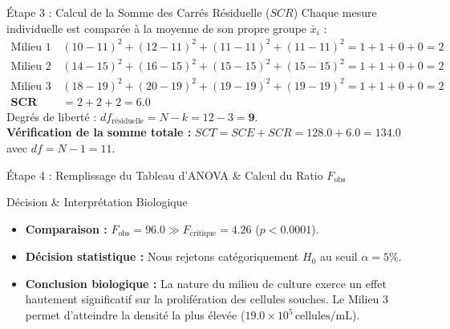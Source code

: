 \documentclass[11pt,a4paper]{article}
\begin{document}
\begin{stepbox}{Étape 3 : Calcul de la Somme des Carrés Résiduelle ($SCR$)}
Chaque mesure individuelle est comparée à la moyenne de son propre groupe $\bar{x}_i$ :
\begin{align*}
\text{Milieu 1 :} \quad & (10-11)^2 + (12-11)^2 + (11-11)^2 + (11-11)^2 = 1 + 1 + 0 + 0 = 2 \\
\text{Milieu 2 :} \quad & (14-15)^2 + (16-15)^2 + (15-15)^2 + (15-15)^2 = 1 + 1 + 0 + 0 = 2 \\
\text{Milieu 3 :} \quad & (18-19)^2 + (20-19)^2 + (19-19)^2 + (19-19)^2 = 1 + 1 + 0 + 0 = 2 \\[1mm]
\mathbf{SCR} &= 2 + 2 + 2 = \mathbf{6.0}
\end{align*}
Degrés de liberté : $df_{\text{résiduelle}} = N - k = 12 - 3 = \mathbf{9}$.\\
\textbf{Vérification de la somme totale :} $SCT = SCE + SCR = 128.0 + 6.0 = 134.0$ avec $df = N - 1 = 11$.
\end{stepbox}

\begin{stepbox}{Étape 4 : Remplissage du Tableau d'ANOVA \& Calcul du Ratio $F_{\text{obs}}$}
\begin{center}
\end{center}
\end{stepbox}

\begin{takeawaybox}{Décision \& Interprétation Biologique}
\begin{itemize}[leftmargin=*, label=\faCheckCircle]
  \item \textbf{Comparaison :} $F_{\text{obs}} = 96.0 \gg F_{\text{critique}} = 4.26$ ($p < 0.0001$).
  \item \textbf{Décision statistique :} Nous rejetons catégoriquement $H_0$ au seuil $\alpha = 5\%$.
  \item \textbf{Conclusion biologique :} La nature du milieu de culture exerce un effet hautement significatif sur la prolifération des cellules souches. Le Milieu 3 permet d'atteindre la densité la plus élevée ($19.0 \times 10^5\,\text{cellules/mL}$).
\end{itemize}
\end{takeawaybox}
\end{document}
